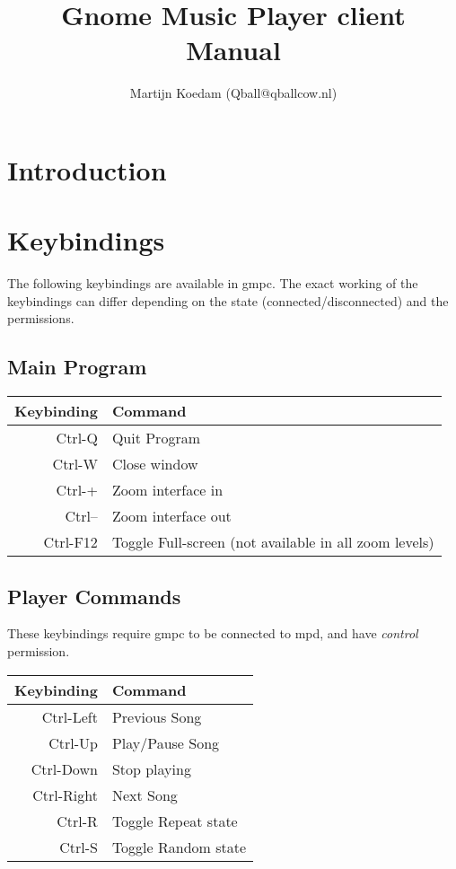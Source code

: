 \documentclass{article}
\begin{document}
\title{Gnome Music Player client\\Manual}
\author{Martijn Koedam (Qball@qballcow.nl)}
\maketitle

\section{Introduction}
\section{Keybindings}
The following keybindings are available in gmpc. The exact working of the keybindings can differ depending on the state (connected/disconnected) and the permissions.
\subsection{Main Program}
\begin{tabular}{r|l}
Keybinding&Command\\
\hline
Ctrl-Q&Quit Program\\
Ctrl-W&Close window\\
Ctrl-+&Zoom interface in\\
Ctrl--&Zoom interface out\\
Ctrl-F12&Toggle Full-screen (not available in all zoom levels)\\
\end{tabular}

\subsection{Player Commands}
These keybindings require gmpc to be connected to mpd, and have \textit{control} permission.\\

\begin{tabular}{r|l}
Keybinding&Command\\
\hline
Ctrl-Left&Previous Song\\
Ctrl-Up&Play/Pause Song\\
Ctrl-Down&Stop playing\\
Ctrl-Right&Next Song\\
Ctrl-R&Toggle Repeat state\\
Ctrl-S&Toggle Random state\\
\end{tabular}
\end{document}
